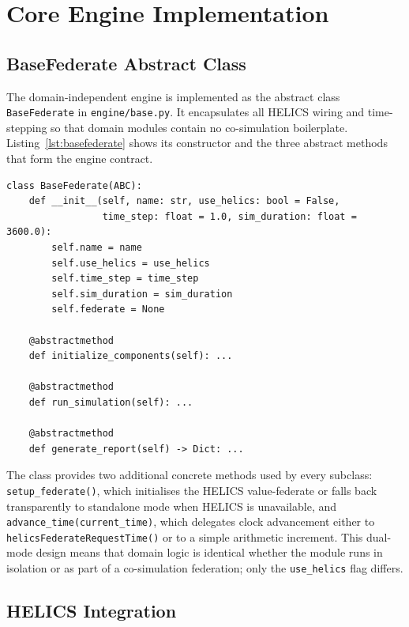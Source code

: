\section{Core Engine Implementation}

\subsection{BaseFederate Abstract Class}

The domain-independent engine is implemented as the abstract class \texttt{BaseFederate} in \texttt{engine/base.py}. It encapsulates all HELICS wiring and time-stepping so that domain modules contain no co-simulation boilerplate. Listing~\ref{lst:basefederate} shows its constructor and the three abstract methods that form the engine contract.

\begin{listing}[h]
\begin{verbatim}
class BaseFederate(ABC):
    def __init__(self, name: str, use_helics: bool = False,
                 time_step: float = 1.0, sim_duration: float = 3600.0):
        self.name = name
        self.use_helics = use_helics
        self.time_step = time_step
        self.sim_duration = sim_duration
        self.federate = None

    @abstractmethod
    def initialize_components(self): ...

    @abstractmethod
    def run_simulation(self): ...

    @abstractmethod
    def generate_report(self) -> Dict: ...
\end{verbatim}
\caption{\texttt{BaseFederate} constructor and abstract interface (engine/base.py)}
\label{lst:basefederate}
\end{listing}

The class provides two additional concrete methods used by every subclass: \texttt{setup\_federate()}, which initialises the HELICS value-federate or falls back transparently to standalone mode when HELICS is unavailable, and \texttt{advance\_time(current\_time)}, which delegates clock advancement either to \texttt{helicsFederateRequestTime()} or to a simple arithmetic increment. This dual-mode design means that domain logic is identical whether the module runs in isolation or as part of a co-simulation federation; only the \texttt{use\_helics} flag differs.

\subsection{HELICS Integration}

